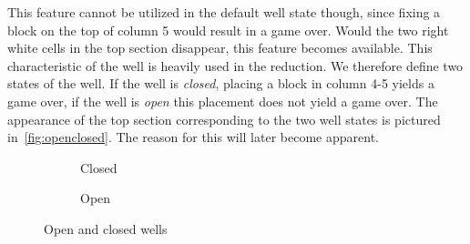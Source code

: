 This feature cannot be utilized in the default well state though, since fixing a block on the top of column 5 would result in a game over. Would the two right white cells in the top section disappear, this feature becomes available. This characteristic of the well is heavily used in the reduction. We therefore define two states of the well. If the well is \textit{closed}, placing a block in column 4-5 yields a game over, if the well is \textit{open} this placement does not yield a game over. The appearance of the top section corresponding to the two well states is pictured in~\autoref{fig:openclosed}. The reason for this will later become apparent.

\begin{figure}[H]
    \centering
    \begin{subfigure}[b]{0.15\linewidth}
        \caption{Closed}
    \end{subfigure}
    \hspace{0.02\linewidth}
    \begin{subfigure}[b]{0.15\linewidth}
        \caption{Open}
    \end{subfigure}
    \caption{Open and closed wells}
    \label{fig:openclosed}
\end{figure}
